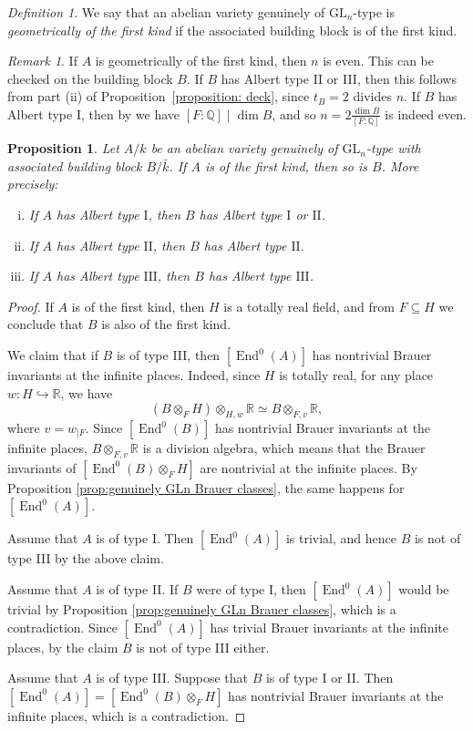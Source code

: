 \documentclass[oneside]{amsart}
\newtheorem{proposition}[theorem]{Proposition}
\theoremstyle{remark}
\newtheorem{remark}[theorem]{Remark}
\newtheorem{definition}[theorem]{Definition}
\newcommand{\kbar}{{\bar{k}}}
\newcommand{\R}{\mathbb R}
\newcommand{\GL}{\mathrm{GL}}
\newcommand{\End}{\operatorname{End}}
\newcommand{\I}{\mathrm{I}}
\newcommand{\II}{\mathrm{II}}
\newcommand{\III}{\mathrm{III}}
\numberwithin{equation}{section}
\newcommand{\QQ}{\mathbb{Q}}
\begin{document}
\begin{definition}
  We say that an abelian variety genuinely of $\GL_n$-type is \emph{geometrically of the first kind} if the associated building block is of the first kind.
\end{definition}

\begin{remark}\label{remark:n even}
	If $A$ is geometrically of the first kind, then $n$ is even. This can be checked on the building block $B$. If $B$ has Albert type II or III, then this follows from part (ii) of Proposition~\ref{proposition: deck}, since $t_B=2$ divides $n$. If $B$ has Albert type I, then by \cite[\S21, pg.202]{Mum74} we have $[F:\QQ]\mid \dim B$, and so $n=2\frac{\dim B}{[F:\QQ]}$ is indeed even.
\end{remark}

\begin{proposition}\label{prop:first kind Schur 1 or 2}
Let $A/k$ be an abelian variety genuinely of $\GL_n$-type with associated building block $B/\kbar$. If $A$ is of the first kind, then so is $B$. More precisely:
\begin{enumerate}[i)]
	\item If $A$ has Albert type $\I$, then $B$ has Albert type $\I$ or $\II$.
	\item If $A$ has Albert type $\II$, then $B$ has Albert type $\II$.
	\item If $A$ has Albert type $\III$, then $B$ has Albert type $\III$.
\end{enumerate}
\end{proposition}

\begin{proof}
 If $A$ is of the first kind, then $H$ is a totally real field, and from $F\subseteq H$ we conclude that $B$ is also of the first kind.
 
 We claim that if $B$ is of type III, then  $[\End^0(A)]$ has nontrivial Brauer invariants at the infinite places. Indeed, since $H$ is totally real, for any place $w\colon H\hookrightarrow \R$, we have 
\[ (B \otimes_F H)\otimes_{H,w}\R \simeq B\otimes_{F,v}\R,\]
where $v=w_{|F}$. Since $[\End^0(B)]$ has nontrivial Brauer invariants at the infinite places,  $B\otimes_{F,v}\R$ is a division algebra, which means that the Brauer invariants of $[\End^0(B)\otimes_F H]$ are nontrivial at the infinite places. By Proposition \ref{prop:genuinely GLn Brauer classes}, the same happens for $[\End^0(A)]$.

 
Assume that $A$ is of type I. Then $[\End^0(A)]$ is trivial, and hence $B$ is not of type III by the above claim.

Assume that $A$ is of type II. If $B$ were of type I, then $[\End^0(A)]$ would be trivial by Proposition \ref{prop:genuinely GLn Brauer classes}, which is a contradiction. Since $[\End^0(A)]$ has trivial Brauer invariants at the infinite places,  by the claim $B$ is not of type III either.

Assume that $A$ is of type III. Suppose that $B$ is of type I or II. Then $[\End^0(A)]=[\End^0(B)\otimes_F H]$ has nontrivial Brauer invariants at the infinite places, which is a contradiction.
\end{proof}
\end{document}
